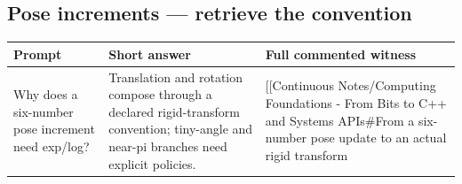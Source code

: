 \subsection{Pose increments --- retrieve the convention}\label{appendix-adf48f5dc5c1-pose-increments-retrieve-the-convention}

\hypertarget{appendix-adf48f5dc5c1-pose-increments-retrieve-the-convention}{}

{\def\LTcaptype{none} %
\begin{longtable}[]{@{}
  >{\raggedright\arraybackslash}p{}
  >{\raggedright\arraybackslash}p{}
  >{\raggedright\arraybackslash}p{}@{}}
\toprule\noalign{}
\begin{minipage}[b]{\linewidth}\raggedright
Prompt
\end{minipage} & \begin{minipage}[b]{\linewidth}\raggedright
Short answer
\end{minipage} & \begin{minipage}[b]{\linewidth}\raggedright
Full commented witness
\end{minipage} \\
\midrule\noalign{}
\endhead
\bottomrule\noalign{}
\endlastfoot
Why does a six-number pose increment need exp/log? & Translation and rotation compose through a declared rigid-transform convention; tiny-angle and near-pi branches need explicit policies. & {[}{[}Continuous Notes/Computing Foundations - From Bits to C++ and Systems APIs\#From a six-number pose update to an actual rigid transform \\
\end{longtable}
}
